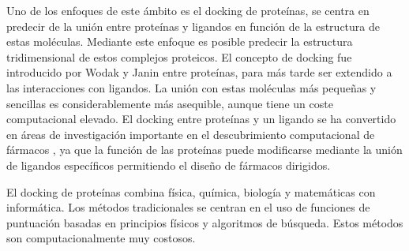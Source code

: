 Uno de los enfoques de este ámbito es el docking de proteínas, se centra en predecir de la unión entre proteínas y ligandos
en función de la estructura de estas moléculas. Mediante este enfoque es posible predecir la estructura tridimensional de
estos complejos proteicos. 
El concepto de docking fue introducido por Wodak y Janin \cite{Janin2003} entre proteínas, para más tarde ser extendido a las interacciones con ligandos.
La unión con estas moléculas más pequeñas y sencillas es considerablemente más asequible, aunque tiene un coste computacional elevado.
El docking entre proteínas y un ligando se ha convertido en  áreas de investigación importante en el descubrimiento computacional de fármacos \cite{DeRuyck}, 
 ya que la función de las
proteínas puede modificarse mediante la unión de ligandos específicos permitiendo el diseño de fármacos dirigidos.

\begin{comment}
Sequencing of the human genome has led to an increase in the number of new
therapeutic targets for pharmaceutical research. In addition, high-throughput crystallography and nuclear magnetic resonance methods have been further developed and
contributed to the acquisition of the atomic structures of proteins and protein–ligand
complexes of an increasing level of detail.1
 When the three-dimensional structure of
the target, even from experiments or computing, exists, a frequently used technique to
design inhibitor molecules is structure-based drug design (SBDD)

Ligand binding is the key step in enzymatic reactions and,
thus, for their inhibition. Therefore, a detailed understanding
of interactions between small molecules and proteins may
form the basis for a rational drug design strategy.45–48 This
approach was widely considered in order to design molecules
addressing a broad range of major pathologies such as cancers49,50 or cardiovascular diseases.5

\end{comment}

El docking de proteínas combina física, química, biología y matemáticas con informática. Los métodos tradicionales se
centran en el uso de funciones de puntuación basadas en principios físicos y algoritmos de búsqueda. Estos métodos son
computacionalmente muy costosos. \cite{??}




\begin{comment}
Protein–protein docking actually predates protein–ligand
(small molecule) docking, as the concept of protein docking
introduced by Wodak and Janin80 was later extended to the
interaction between macromolecules and small ligands.81 The
treatment of flexibility in the binding process is considerably
easier with small molecules, even though a considerable
computational cost is involved, and small molecule docking has become one of the most active research areas in
computational drug discovery. 
\end{comment}



